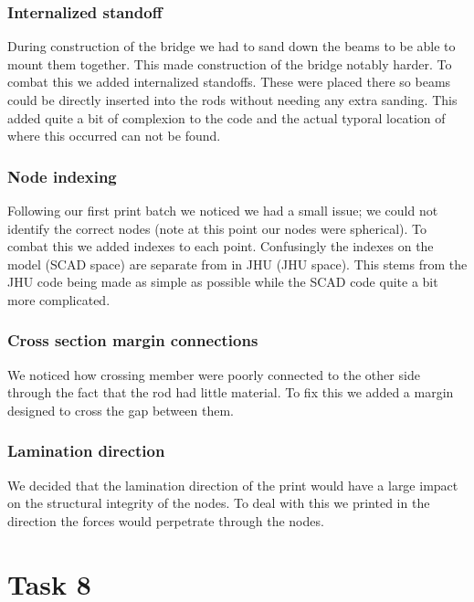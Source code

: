 \documentclass{report}
\begin{document}
\subsubsection {Internalized standoff}

During construction of the bridge we had to sand down the beams to be able to mount them together. This made construction of the bridge notably harder. To combat this we added internalized standoffs. These were placed there so beams could be directly inserted into the rods without needing any extra sanding. This added quite a bit of complexion to the code and the actual typoral location of where this occurred can not be found.

\subsubsection {Node indexing}

Following our first print batch we noticed we had a small issue; we could not identify the correct nodes (note at this point our nodes were spherical). To combat this we added indexes to each point. Confusingly the indexes on the model (SCAD space) are separate from in JHU (JHU space). This stems from the JHU code being made as simple as possible while the SCAD code quite a bit more complicated.

\subsubsection {Cross section margin connections}

We noticed how crossing member were poorly connected to the other side through the fact that the rod had little material. To fix this we added a margin designed to cross the gap between them.

\subsubsection {Lamination direction}

We decided that the lamination direction of the print would have a large impact on the structural integrity of the nodes. To deal with this we printed in the direction the forces would perpetrate through the nodes.

\section{Task 8}
\label{sec:8}
\end{document}
